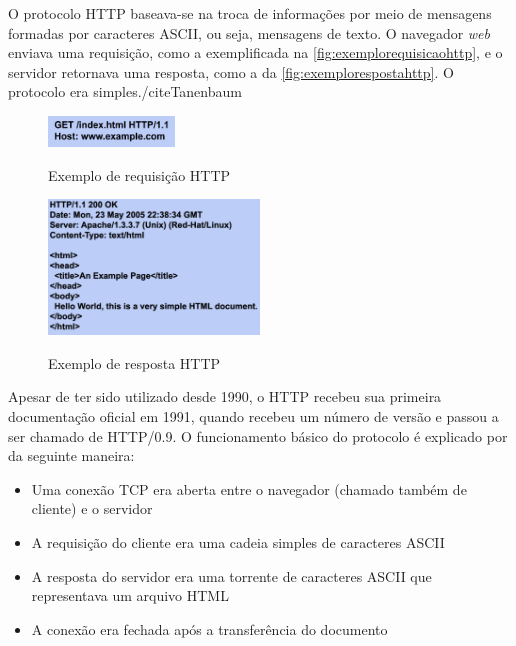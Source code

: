 O protocolo HTTP baseava-se na troca de informações por meio de mensagens formadas por caracteres ASCII, ou seja, mensagens de texto. O navegador \textit{web} enviava uma requisição, como a exemplificada na \autoref{fig:exemplorequisicaohttp}, e o servidor retornava uma resposta, como a da \autoref{fig:exemplorespostahttp}. O protocolo era simples./cite{Tanenbaum}

\begin{figure}[!htb]
    \centering
    \caption{Exemplo de requisição HTTP}
    \includegraphics[width=0.3\textwidth]{./04-figuras/fund-teorica/http_exemplo_requisicao}
    \label{fig:exemplorequisicaohttp}
\end{figure}

\begin{figure}[!htb]
    \centering
    \caption{Exemplo de resposta HTTP}
    \includegraphics[width=0.5\textwidth]{./04-figuras/fund-teorica/http_exemplo_resposta}
    \label{fig:exemplorespostahttp}
\end{figure}

Apesar de ter sido utilizado desde 1990, o HTTP recebeu sua primeira documentação oficial em 1991, quando recebeu um número de versão e passou a ser chamado de HTTP/0.9. O funcionamento básico do protocolo é explicado por  da seguinte maneira:

\begin{itemize}
	\item Uma conexão TCP era aberta entre o navegador (chamado também de cliente) e o servidor
	\item A requisição do cliente era uma cadeia simples de caracteres ASCII
	\item A resposta do servidor era uma torrente de caracteres ASCII que representava um arquivo HTML
	\item A conexão era fechada após a transferência do documento 
\end{itemize}

